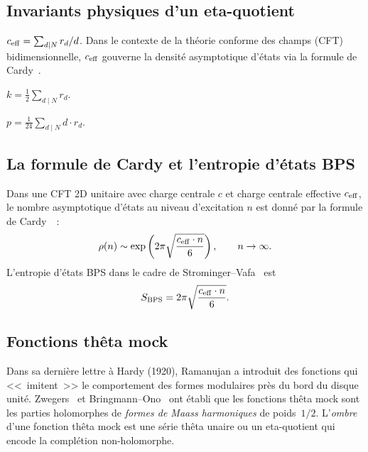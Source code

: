 \subsection{Invariants physiques d'un eta-quotient}

\begin{definition}
$c_{\mathrm{eff}} = \sum_{d \mid N} r_d / d$.
Dans le contexte de la théorie conforme des champs (CFT) bidimensionnelle, $c_{\mathrm{eff}}$ gouverne la densité asymptotique d'états via la formule de Cardy~\cite{cardy_1986}.
\end{definition}

\begin{definition}
$k = \frac{1}{2} \sum_{d \mid N} r_d$.
\end{definition}

\begin{definition}
$p = \frac{1}{24} \sum_{d \mid N} d \cdot r_d$.
\end{definition}

\subsection{La formule de Cardy et l'entropie d'états BPS}

Dans une CFT 2D unitaire avec charge centrale $c$ et charge centrale effective $c_{\mathrm{eff}}$, le nombre asymptotique d'états au niveau d'excitation $n$ est donné par la formule de Cardy~\cite{cardy_1986}~:
\begin{equation}
  \rho(n) \sim \exp\left(2\pi \sqrt{\frac{c_{\mathrm{eff}} \cdot n}{6}}\right), \qquad n \to \infty.
\end{equation}
L'entropie d'états BPS dans le cadre de Strominger--Vafa~\cite{strominger_vafa_1996} est
\begin{equation}
  S_{\mathrm{BPS}} = 2\pi \sqrt{\frac{c_{\mathrm{eff}} \cdot n}{6}}.
\end{equation}

\subsection{Fonctions thêta mock}

\begin{definition}
Dans sa dernière lettre à Hardy (1920), Ramanujan a introduit des fonctions qui <<~imitent~>> le comportement des formes modulaires près du bord du disque unité. Zwegers~\cite{zwegers2002} et Bringmann--Ono~\cite{bringmann_ono_2006} ont établi que les fonctions thêta mock sont les parties holomorphes de \emph{formes de Maass harmoniques} de poids~$1/2$. L'\emph{ombre} d'une fonction thêta mock est une série thêta unaire ou un eta-quotient qui encode la complétion non-holomorphe.
\end{definition}

